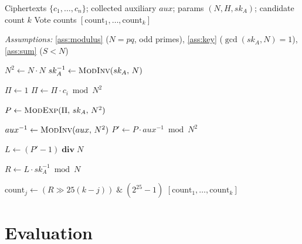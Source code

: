 \documentclass[11pt, a4paper]{article}
\begin{document}
\begin{algorithm}[h]
\caption{Vote Aggregation (server-side, native libtommath)}
\label{alg:aggregate}
\begin{algorithmic}[1]
\Require Ciphertexts $\{c_1, \ldots, c_n\}$; collected auxiliary $aux$; params $(N, H, sk_A)$; candidate count $k$
\Ensure Vote counts $[\text{count}_1, \ldots, \text{count}_k]$

\Statex \textit{Assumptions:} \ref{ass:modulus} ($N{=}pq$, odd primes), \ref{ass:key} ($\gcd(sk_A,N){=}1$), \ref{ass:sum} ($S{<}N$)

\State $N^2 \gets N \cdot N$
\State $sk_A^{-1} \gets \textsc{ModInv}(sk_A,\, N)$ 

\Statex {}
\State $\Pi \gets 1$
    \State $\Pi \gets \Pi \cdot c_i \bmod N^2$ 
\EndFor

\Statex {}
\State $P \gets \textsc{ModExp}(\Pi,\, sk_A,\, N^2)$ 

\Statex {}
\State $aux^{-1} \gets \textsc{ModInv}(aux,\, N^2)$ 
\State $P' \gets P \cdot aux^{-1} \bmod N^2$

\Statex {}
\State $L \gets (P' - 1) \;\mathbf{div}\; N$ 

\Statex {}
\State $R \gets L \cdot sk_A^{-1} \bmod N$ 

\Statex {}
    \State $\text{count}_j \gets (R \gg 25(k-j)) \;\&\; (2^{25}-1)$ 
\EndFor
\State \Return $[\text{count}_1, \ldots, \text{count}_k]$
\end{algorithmic}
\end{algorithm}

\section{Evaluation}\label{sec:evaluation}
\end{document}
